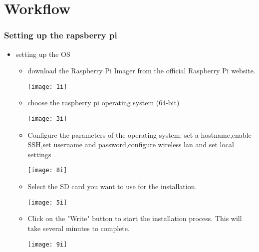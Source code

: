 \section{Workflow}
\subsubsection{Setting up the rapsberry pi}
\begin{itemize}
\item{ setting up the OS }
\begin{itemize}

\item 

\begin{minipage}{0.5\textwidth}
download the Raspberry Pi Imager from the official Raspberry Pi website.
\end{minipage}
\hfill
\begin{minipage}{0.6\textwidth}
\hspace*{0.3in} \texttt{[image: 1i]}
\end{minipage}
\vspace{0.5in}

\item 
\begin{minipage}{0.5\textwidth}
choose the raspberry pi operating system (64-bit)
\end{minipage}
\hfill
\begin{minipage}{0.6\textwidth}
\texttt{[image: 3i]}
\end{minipage}
\vspace{0.5in}
\item 
\begin{minipage}{0.5\textwidth}
Configure the parameters of the operating system: set a hostname,enable SSH,set username and password,configure wireless lan and set local settings
\end{minipage}
\hfill
\begin{minipage}{0.6\textwidth}
\texttt{[image: 8i]}
\end{minipage}
\vspace{0.5in}
\item 
\begin{minipage}{0.5\textwidth}
Select the SD card you want to use for the installation.
\end{minipage}
\hfill
\begin{minipage}{0.6\textwidth}
\texttt{[image: 5i]}
\end{minipage}
\vspace{0.5in}
\item 
\begin{minipage}{0.5\textwidth}
Click on the "Write" button to start the installation process. This will take several minutes to complete.
\end{minipage}
\hfill
\begin{minipage}{0.6\textwidth}
\texttt{[image: 9i]}
\end{minipage}
\end{itemize}



\end{itemize}
